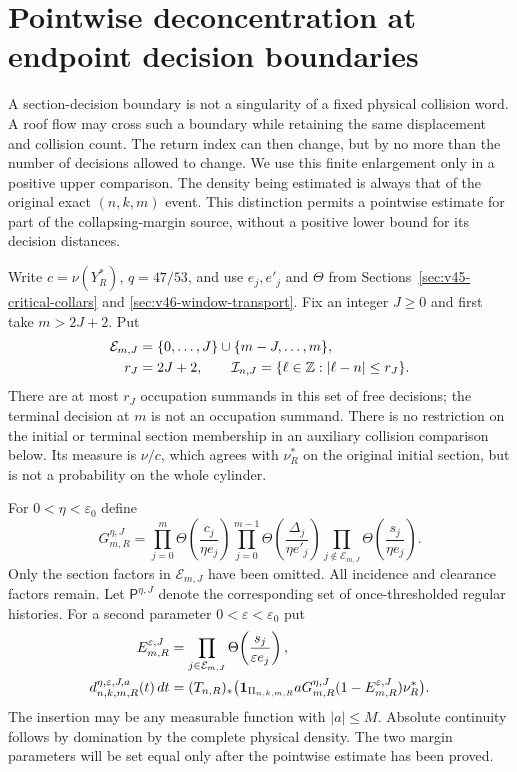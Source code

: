 \section{Pointwise deconcentration at endpoint decision boundaries}
\label{sec:v47-endpoint-decisions}
A section-decision boundary is not a singularity of a fixed physical
collision word. A roof flow may cross such a boundary while retaining
the same displacement and collision count. The return index can then
change, but by no more than the number of decisions allowed to change.
We use this finite enlargement only in a positive upper comparison.
The density being estimated is always that of the original exact
$(n,k,m)$ event. This distinction permits a pointwise estimate for part
of the collapsing-margin source, without a positive lower bound for
its decision distances.

Write $c=\nu(Y_R^*)$, $q=47/53$, and use $e_j,e'_j$ and $\Theta$ from
Sections~\ref{sec:v45-critical-collars} and
\ref{sec:v46-window-transport}. Fix an integer $J\ge0$ and first take
$m>2J+2$. Put
\begin{align}
 \mathcal E_{m,J}&=\{0,\ldots,J\}\cup\{m-J,\ldots,m\},\notag\\
 r_J&=2J+2,\qquad
 \mathcal I_{n,J}=\{\ell\in\Z:|\ell-n|\le r_J\}.
                                      \label{eq:v47-free-decisions}
\end{align}
There are at most $r_J$ occupation summands in this set of free
decisions; the terminal decision at $m$ is not an occupation summand.
There is no restriction on the initial or terminal section membership
in an auxiliary collision comparison below. Its measure is $\nu/c$,
which agrees with $\nu_R^*$ on the original initial section, but is
not a probability on the whole cylinder.

For $0<\eta<\varepsilon_0$ define
\begin{equation}\label{eq:v47-partial-guard}
 G_{m,R}^{\eta,J}=
 \prod_{j=0}^{m}\Theta\!\left(\frac{c_j}{\eta e_j}\right)
 \prod_{j=0}^{m-1}\Theta\!\left(\frac{\Delta_j}{\eta e'_j}\right)
 \prod_{j\notin\mathcal E_{m,J}}
                    \Theta\!\left(\frac{s_j}{\eta e_j}\right).
\end{equation}
Only the section factors in $\mathcal E_{m,J}$ have been omitted.
All incidence and clearance factors remain. Let $\mathsf P^{\eta,J}$
denote the corresponding set of once-thresholded regular histories.
For a second parameter $0<\varepsilon<\varepsilon_0$ put
\begin{align}
 E_{m,R}^{\varepsilon,J}
  &=\prod_{j\in\mathcal E_{m,J}}
                     \Theta\!\left(\frac{s_j}{\varepsilon e_j}\right),
                                                         \notag\\
 d^{\eta,\varepsilon,J,a}_{n,k,m,R}(t)\,dt
  &=(T_{n,R})_*\bigl(\one_{\Pi_{n,k,m,R}}a
             G_{m,R}^{\eta,J}(1-E_{m,R}^{\varepsilon,J})\nu_R^*\bigr).
                                      \label{eq:v47-end-source}
\end{align}
The insertion may be any measurable function with $|a|\le M$.
Absolute continuity follows by domination by the complete physical
density. The two margin parameters will be set equal only after the
pointwise estimate has been proved.


